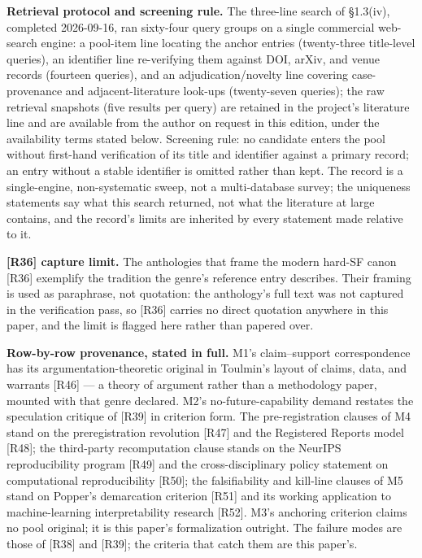 \documentclass[11pt,a4paper]{article}
\begin{document}
\textbf{Retrieval protocol and screening rule.} The three-line search of §1.3(iv), completed 2026-09-16, ran sixty-four query groups on a single commercial web-search engine: a pool-item line locating the anchor entries (twenty-three title-level queries), an identifier line re-verifying them against DOI, arXiv, and venue records (fourteen queries), and an adjudication/novelty line covering case-provenance and adjacent-literature look-ups (twenty-seven queries); the raw retrieval snapshots (five results per query) are retained in the project's literature line and are available from the author on request in this edition, under the availability terms stated below. Screening rule: no candidate enters the pool without first-hand verification of its title and identifier against a primary record; an entry without a stable identifier is omitted rather than kept. The record is a single-engine, non-systematic sweep, not a multi-database survey; the uniqueness statements say what this search returned, not what the literature at large contains, and the record's limits are inherited by every statement made relative to it.

\textbf{[R36] capture limit.} The anthologies that frame the modern hard-SF canon [R36] exemplify the tradition the genre's reference entry describes. Their framing is used as paraphrase, not quotation: the anthology's full text was not captured in the verification pass, so [R36] carries no direct quotation anywhere in this paper, and the limit is flagged here rather than papered over.

\textbf{Row-by-row provenance, stated in full.} M1's claim–support correspondence has its argumentation-theoretic original in Toulmin's layout of claims, data, and warrants [R46] — a theory of argument rather than a methodology paper, mounted with that genre declared. M2's no-future-capability demand restates the speculation critique of [R39] in criterion form. The pre-registration clauses of M4 stand on the preregistration revolution [R47] and the Registered Reports model [R48]; the third-party recomputation clause stands on the NeurIPS reproducibility program [R49] and the cross-disciplinary policy statement on computational reproducibility [R50]; the falsifiability and kill-line clauses of M5 stand on Popper's demarcation criterion [R51] and its working application to machine-learning interpretability research [R52]. M3's anchoring criterion claims no pool original; it is this paper's formalization outright. The failure modes are those of [R38] and [R39]; the criteria that catch them are this paper's.
\end{document}
